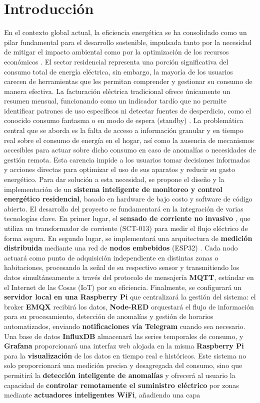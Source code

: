 \section{Introducción}
    En el contexto global actual, la eficiencia energética se ha consolidado como un pilar fundamental para el desarrollo sostenible, impulsada tanto por la necesidad de mitigar el impacto ambiental como por la optimización de los recursos económicos \cite{chevez2018energias}. El sector residencial representa una porción significativa del consumo total de energía eléctrica, sin embargo, la mayoría de los usuarios carecen de herramientas que les permitan comprender y gestionar su consumo de manera efectiva. La facturación eléctrica tradicional ofrece únicamente un resumen mensual, funcionando como un indicador tardío que no permite identificar patrones de uso específicos ni detectar fuentes de desperdicio, como el conocido consumo fantasma o en modo de espera (standby) \cite{iea2022standby}. La problemática central que se aborda es la falta de acceso a información granular y en tiempo real sobre el consumo de energía en el hogar, así como la ausencia de mecanismos accesibles para actuar sobre dicho consumo en caso de anomalías o necesidades de gestión remota. Esta carencia impide a los usuarios tomar decisiones informadas y acciones directas para optimizar el uso de sus aparatos y reducir su gasto energético. Para dar solución a esta necesidad, se propone el diseño y la implementación de un \textbf{sistema inteligente de monitoreo y control energético residencial}, basado en hardware de bajo costo y software de código abierto. El desarrollo del proyecto se fundamentará en la integración de varias tecnologías clave. En primer lugar, el \textbf{sensado de corriente no invasivo} \cite{fraden2016handbook}, que utiliza un transformador de corriente (SCT-013) para medir el flujo eléctrico de forma segura. En segundo lugar, se implementará una arquitectura de \textbf{medición distribuida} mediante una red de \textbf{nodos embebidos} (ESP32) \cite{vahid2002embedded}. Cada nodo actuará como punto de adquisición independiente en distintas zonas o habitaciones, procesando la señal de su respectivo sensor y transmitiendo los datos simultáneamente a través del protocolo de mensajería \textbf{MQTT}, estándar en el Internet de las Cosas (IoT) por su eficiencia. Finalmente, se configurará un \textbf{servidor local en una Raspberry Pi} que centralizará la gestión del sistema: el broker \textbf{EMQX} recibirá los datos, \textbf{Node-RED} orquestará el flujo de información para su procesamiento, detección de anomalías y gestión de horarios automatizados, enviando \textbf{notificaciones vía Telegram} cuando sea necesario. Una base de datos \textbf{InfluxDB} almacenará las series temporales de consumo, y \textbf{Grafana} proporcionará una interfaz web alojada en la misma \textbf{Raspberry Pi} para la \textbf{visualización} de los datos en tiempo real e históricos. Este sistema no solo proporcionará una medición precisa y desagregada del consumo, sino que permitirá la \textbf{detección inteligente de anomalías} y ofrecerá al usuario la capacidad de \textbf{controlar remotamente el suministro eléctrico} por zonas mediante \textbf{actuadores inteligentes WiFi}, añadiendo una capa 
